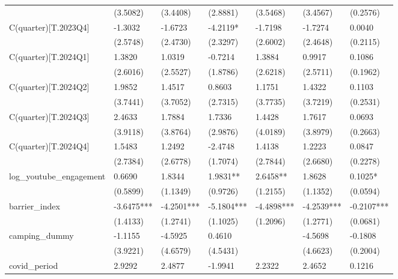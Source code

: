 \begin{table}
\begin{center}
\begin{tabular}{lllllll}
                         & (3.5082)   & (3.4408)   & (2.8881)   & (3.5468)   & (3.4567)   & (0.2576)    \\
C(quarter)[T.2023Q4]     & -1.3032    & -1.6723    & -4.2119*   & -1.7198    & -1.7274    & 0.0040      \\
                         & (2.5748)   & (2.4730)   & (2.3297)   & (2.6002)   & (2.4648)   & (0.2115)    \\
C(quarter)[T.2024Q1]     & 1.3820     & 1.0319     & -0.7214    & 1.3884     & 0.9917     & 0.1086      \\
                         & (2.6016)   & (2.5527)   & (1.8786)   & (2.6218)   & (2.5711)   & (0.1962)    \\
C(quarter)[T.2024Q2]     & 1.9852     & 1.4517     & 0.8603     & 1.1751     & 1.4322     & 0.1103      \\
                         & (3.7441)   & (3.7052)   & (2.7315)   & (3.7735)   & (3.7219)   & (0.2531)    \\
C(quarter)[T.2024Q3]     & 2.4633     & 1.7884     & 1.7336     & 1.4428     & 1.7617     & 0.0693      \\
                         & (3.9118)   & (3.8764)   & (2.9876)   & (4.0189)   & (3.8979)   & (0.2663)    \\
C(quarter)[T.2024Q4]     & 1.5483     & 1.2492     & -2.4748    & 1.4138     & 1.2223     & 0.0847      \\
                         & (2.7384)   & (2.6778)   & (1.7074)   & (2.7844)   & (2.6680)   & (0.2278)    \\
log\_youtube\_engagement & 0.6690     & 1.8344     & 1.9831**   & 2.6458**   & 1.8628     & 0.1025*     \\
                         & (0.5899)   & (1.1349)   & (0.9726)   & (1.2155)   & (1.1352)   & (0.0594)    \\
barrier\_index           & -3.6475*** & -4.2501*** & -5.1804*** & -4.4898*** & -4.2539*** & -0.2107***  \\
                         & (1.4133)   & (1.2741)   & (1.1025)   & (1.2096)   & (1.2771)   & (0.0681)    \\
camping\_dummy           & -1.1155    & -4.5925    & 0.4610     &            & -4.5698    & -0.1808     \\
                         & (3.9221)   & (4.6579)   & (4.5431)   &            & (4.6623)   & (0.2004)    \\
covid\_period            & 2.9292     & 2.4877     & -1.9941    & 2.2322     & 2.4652     & 0.1216      \\

\end{tabular}
\end{center}
\end{table}
